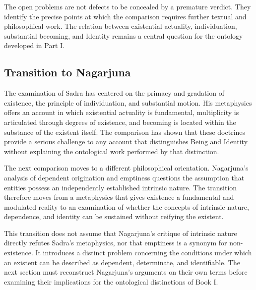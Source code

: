 \label{para:VS.B01.P01.C08.S17.SS19.P006}

The open problems
are not defects
to be concealed
by a premature
verdict. They
identify the precise
points at which
the comparison
requires further
textual and
philosophical work.
The relation
between existential
actuality, individuation,
substantial becoming,
and Identity
remains a central
question for
the ontology
developed in
Part I.




\subsection{Transition to Nagarjuna}
\label{subsec:ch08_s17_ss20}

\label{para:VS.B01.P01.C08.S17.SS20.P001}

The examination of Sadra
has centered on
the primacy and
gradation of existence,
the principle of
individuation, and
substantial motion.
His metaphysics offers
an account in
which existential
actuality is
fundamental, multiplicity
is articulated
through degrees
of existence,
and becoming
is located
within the
substance of
the existent itself.
The comparison
has shown that
these doctrines
provide a serious
challenge to
any account
that distinguishes
Being and Identity
without explaining
the ontological
work performed
by that distinction.

\label{para:VS.B01.P01.C08.S17.SS20.P002}

The next comparison
moves to a
different philosophical
orientation. Nagarjuna's
analysis of
dependent origination
and emptiness
questions the
assumption that
entities possess
an independently
established intrinsic
nature. The
transition therefore
moves from
a metaphysics
that gives
existence a
fundamental and
modulated reality
to an examination
of whether
the concepts
of intrinsic
nature, dependence,
and identity
can be sustained
without reifying
the existent.

\label{para:VS.B01.P01.C08.S17.SS20.P003}

This transition
does not assume
that Nagarjuna's
critique of
intrinsic nature
directly refutes
Sadra's metaphysics,
nor that
emptiness is
a synonym
for non-existence.
It introduces
a distinct
problem concerning
the conditions
under which
an existent
can be
described as
dependent, determinate,
and identifiable.
The next
section must
reconstruct Nagarjuna's
arguments on
their own terms
before examining
their implications
for the ontological
distinctions of
Book I.


